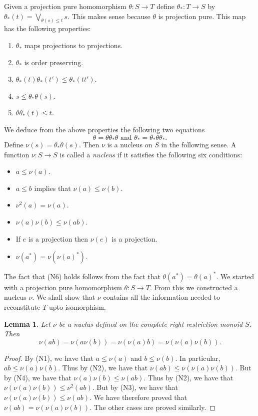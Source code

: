 \documentclass[a4paper]{amsart}
\newtheorem{lemma}[theorem]{Lemma}
\begin{document}
Given a projection pure homomorphism 
$\theta \colon S \rightarrow T$ 
define
$\theta_{\ast} \colon T \rightarrow S$ 
by $\theta_{\ast}(t) = \bigvee_{\theta (s) \leq t} s$.
This makes sense because $\theta$ is projection pure.
This map has the following properties:
\begin{enumerate}
\item $\theta_{\ast}$ maps projections to projections.
\item $\theta_{\ast}$ is order preserving.
\item $\theta_{\ast}(t)\theta_{\ast}(t') \leq \theta_{\ast}(tt')$.
\item $s \leq \theta_{\ast} \theta (s)$.
\item $\theta \theta_{\ast}(t) \leq t$.
\end{enumerate}
We deduce from the above properties the following two equations
$$\theta = \theta \theta_{\ast} \theta \text{ and } \theta_{\ast} = \theta_{\ast} \theta \theta_{\ast}.$$
Define $\nu (s) = \theta_{\ast} \theta (s)$.
Then $\nu$ is a nucleus on $S$ in the following sense.
A function $\nu \colon S \rightarrow S$ is called a {\em nucleus} if it satisfies the following
six conditions:
\begin{itemize}
\item[{\rm (N1).}] $a \leq \nu (a)$.
\item[{\rm (N2).}] $a \leq b$ implies that $\nu (a) \leq \nu (b)$.
\item[{\rm (N3).}] $\nu^{2}(a) = \nu (a)$.
\item[{\rm (N4).}] $\nu (a) \nu (b) \leq \nu (ab)$.
\item[{\rm (N5).}] If $e$ is a projection then $\nu (e)$ is a projection.
\item[{\rm (N6).}] $\nu (a^{\ast}) = \nu (\nu (a)^{\ast})$.
\end{itemize}
The fact that (N6) holds follows from the fact that $\theta (a^{\ast}) = \theta (a)^{\ast}$.
We started with a projection pure homomorphism $\theta \colon S \rightarrow T$.
From this we constructed a nucleus $\nu$.
We shall show that $\nu$ contains all the information needed to reconstitute $T$
upto isomorphism. 

\begin{lemma}\label{lem:nucleus-properties} 
Let $\nu$ be a nuclus defined on the complete right restriction monoid $S$.
Then 
$$\nu (ab) = \nu (a \nu (b)) = \nu (\nu (a)b) = \nu (\nu (a) \nu (b)).$$
\end{lemma}
\begin{proof} By (N1), we have that $a \leq \nu (a)$ and $b \leq \nu (b)$.
In particular, $ab \leq \nu (a)\nu (b)$.
Thus by (N2), we have that $\nu (ab) \leq \nu (\nu (a)\nu (b))$.
But by (N4), we have that $\nu (a)\nu (b) \leq  \nu(ab)$.
Thus by (N2), we have that $\nu (\nu (a)\nu (b)) \leq \nu^{2}(ab)$.
But by (N3), we have that  $\nu (\nu (a)\nu (b)) \leq \nu (ab)$.
We have therefore proved that 
$\nu (ab) = \nu(\nu (a) \nu (b))$.
The other cases are proved similarly. 
\end{proof}
\end{document}
